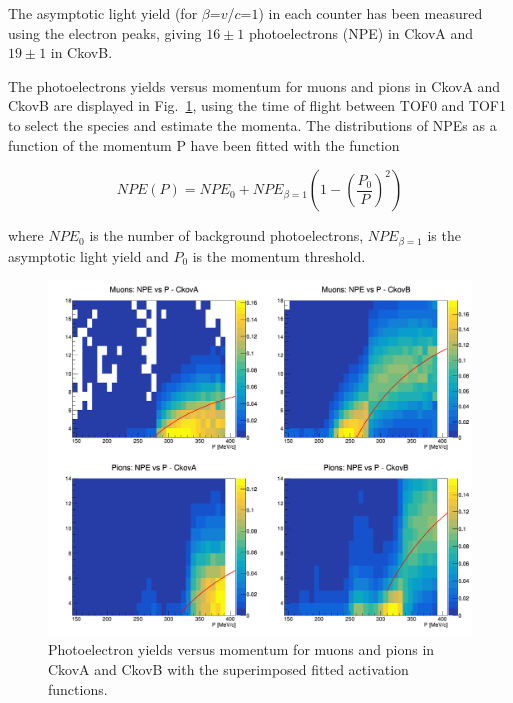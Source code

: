 The asymptotic light yield (for $\beta$=$v$/$c$=$1$) in each counter has been measured using the electron peaks, giving $16\pm1$ photoelectrons (NPE) in CkovA and $19\pm1$ in CkovB.

The photoelectrons yields versus momentum for muons and pions in CkovA and CkovB are displayed in Fig.~\ref{fig:ckov2}, using the time of flight between TOF0 and TOF1 to select the species and estimate the momenta.
The distributions of NPEs as a function of the momentum P have been fitted with the function

\begin{equation}
NPE(P) = NPE_0 + NPE_{\beta=1}\left(1-\left(\frac{P_0}{P}\right)^2\right)
\end{equation}

where $NPE_0$ is the number of background photoelectrons, $NPE_{\beta=1}$ is the asymptotic light yield and $P_0$ is the momentum threshold.


\begin{figure}[htb!]
  \begin{center}
    \includegraphics[width=0.85\columnwidth]{./03-Ckov/Figures/scatter_activation.png}
    \caption{Photoelectron yields versus momentum for muons and pions in CkovA and CkovB with the superimposed fitted activation functions.}
    \label{fig:ckov2}
  \end{center}
\end{figure}

